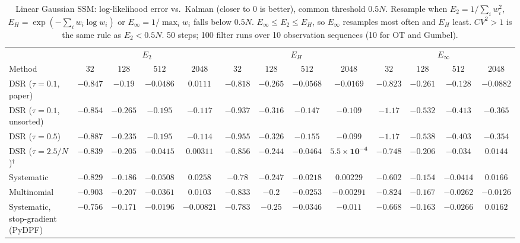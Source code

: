 \begin{table}[ht]
\centering
\small
\caption{Linear Gaussian SSM: log-likelihood error vs.\ Kalman (closer to 0 is better), common threshold $0.5N$. Resample when $E_2=1/\sum_iw_i^2$, $E_H=\exp(-\sum_iw_i\log w_i)$ or $E_\infty=1/\max_iw_i$ falls below $0.5N$. $E_\infty\le E_2\le E_H$, so $E_\infty$ resamples most often and $E_H$ least. $CV^2>1$ is the same rule as $E_2<0.5N$. 50 steps; 100 filter runs over 10 observation sequences (10 for OT and Gumbel).}
\label{tab:trigger-fixed-linear-loglik_error}
\begin{adjustbox}{max width=\linewidth}
\begin{tabular}{lcccc|cccc|cccc}
\toprule
 & \multicolumn{4}{c}{$E_2$} & \multicolumn{4}{c}{$E_H$} & \multicolumn{4}{c}{$E_\infty$} \\
\cmidrule(lr){2-5} \cmidrule(lr){6-9} \cmidrule(lr){10-13}
Method & $32$ & $128$ & $512$ & $2048$ & $32$ & $128$ & $512$ & $2048$ & $32$ & $128$ & $512$ & $2048$ \\
\midrule
DSR ($\tau{=}0.1$, paper) & $-0.847$ & $\mathbf{-0.19}$ & $\mathbf{-0.0486}$ & $\mathbf{0.0111}$ & $\mathbf{-0.818}$ & $-0.265$ & $-0.0568$ & $-0.0169$ & $-0.823$ & $-0.261$ & $-0.128$ & $-0.0882$ \\
DSR ($\tau{=}0.1$, unsorted) & $\mathbf{-0.854}$ & $\mathbf{-0.265}$ & $-0.195$ & $-0.117$ & $-0.937$ & $-0.316$ & $\mathbf{-0.147}$ & $\mathbf{-0.109}$ & $-1.17$ & $-0.532$ & $-0.413$ & $-0.365$ \\
DSR ($\tau{=}0.5$) & $\mathbf{-0.887}$ & $\mathbf{-0.235}$ & $-0.195$ & $-0.114$ & $-0.955$ & $-0.326$ & $\mathbf{-0.155}$ & $\mathbf{-0.099}$ & $-1.17$ & $-0.538$ & $-0.403$ & $-0.354$ \\
DSR ($\tau{=}2.5/N$)$^\dagger$ & $-0.839$ & $\mathbf{-0.205}$ & $-0.0415$ & $0.00311$ & $-0.856$ & $-0.244$ & $-0.0464$ & $\mathbf{5.5\times10^{-4}}$ & $\mathbf{-0.748}$ & $-0.206$ & $\mathbf{-0.034}$ & $0.0144$ \\
\midrule
Systematic & $-0.829$ & $-0.186$ & $-0.0508$ & $0.0258$ & $-0.78$ & $-0.247$ & $\mathbf{-0.0218}$ & $\mathbf{0.00229}$ & $\mathbf{-0.602}$ & $\mathbf{-0.154}$ & $-0.0414$ & $0.0166$ \\
Multinomial & $-0.903$ & $-0.207$ & $-0.0361$ & $0.0103$ & $-0.833$ & $-0.2$ & $\mathbf{-0.0253}$ & $\mathbf{-0.00291}$ & $\mathbf{-0.824}$ & $\mathbf{-0.167}$ & $-0.0262$ & $-0.0126$ \\
Systematic, stop-gradient (PyDPF) & $-0.756$ & $-0.171$ & $\mathbf{-0.0196}$ & $\mathbf{-0.00821}$ & $-0.783$ & $-0.25$ & $-0.0346$ & $-0.011$ & $\mathbf{-0.668}$ & $\mathbf{-0.163}$ & $-0.0266$ & $0.0162$ \\

\end{tabular}
\end{adjustbox}
\end{table}
